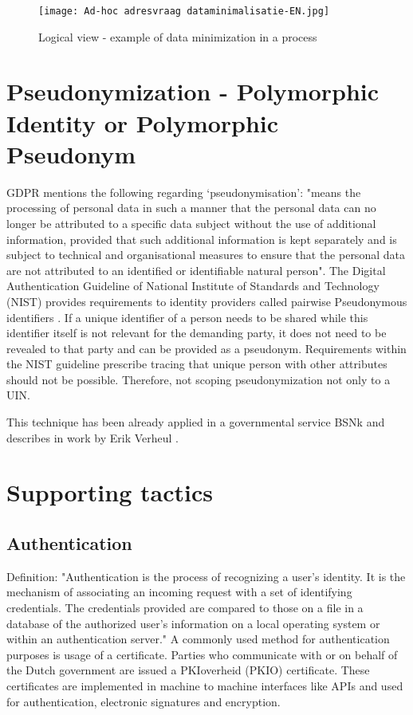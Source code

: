     \begin{figure}
        \graphicspath{ {./images/} }
        \centering
        \texttt{[image: Ad-hoc adresvraag dataminimalisatie-EN.jpg]}\\
        \caption{Logical view - example of data minimization in a process}
        \label{fig:Adhoc}
    \end{figure}

\section{Pseudonymization - Polymorphic Identity or Polymorphic Pseudonym}
GDPR \cite{GDPR} mentions the following regarding ‘pseudonymisation': "means the processing of personal data in such a manner that the personal data can no longer be attributed to a specific data subject without the use of additional information, provided that such additional information is kept separately and is subject to technical and organisational measures to ensure that the personal data are not attributed to an identified or identifiable natural person". The Digital Authentication Guideline of National Institute of Standards and Technology (NIST) provides requirements to identity providers called pairwise Pseudonymous identifiers \cite{NIST_800-63C}. If a unique identifier of a person needs to be shared while this identifier itself is not relevant for the demanding party, it does not need to be revealed to that party and can be provided as a pseudonym. Requirements within the NIST guideline prescribe tracing that unique person with other attributes should not be possible. Therefore, not scoping pseudonymization not only to a UIN.

This technique has been already applied in a governmental service BSNk \cite{Logius_BSNk} and describes in work by Erik Verheul \cite{VerheuleID}.

\section{Supporting tactics}

\subsection{Authentication} \label{authentication}
Definition: "Authentication is the process of recognizing a user’s identity. It is the mechanism of associating an incoming request with a set of identifying credentials. The credentials provided are compared to those on a file in a database of the authorized user’s information on a local operating system or within an authentication server." \cite{authentication}
A commonly used method for authentication purposes is usage of a certificate. Parties who communicate with or on behalf of the Dutch government are issued a PKIoverheid (PKIO) certificate. These certificates are implemented in machine to machine interfaces like APIs and used for authentication, electronic signatures and encryption. \cite{Logius_PKIO}

